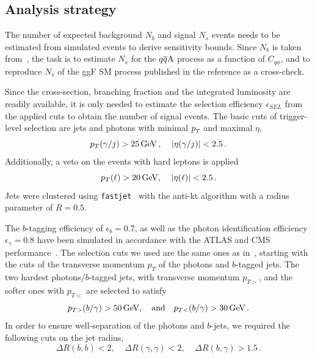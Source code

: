 \subsection{Analysis strategy}
\par The number of expected background $N_b$ and signal $N_s$ events needs to be estimated from simulated events to derive sensitivity bounds. Since  $N_b$ is  taken from~\cite{Azatov:2015oxa}, the task is to estimate $N_s$ for the $q\overline q \rm A$ process as a function of $C_{q\phi}$, and to reproduce $N_s$ of the ggF SM process published in the reference as a cross-check.
\par Since the cross-section, branching fraction and the integrated luminosity are readily available, it is only needed to estimate the selection efficiency $\epsilon_{SEL}$ from the applied cuts to obtain the number of signal events. The basic cuts of trigger-level selection are jets and photons with minimal $p_{\scriptscriptstyle T}$ and maximal $\eta$,
\begin{equation}
	p_T(\gamma/j) > 25 \, \GeV\,, \; \; \; \; |\eta(\gamma/j)| < 2.5\,.
	\label{tricut1}
\end{equation}
Additionally, a veto on the events with hard leptons is applied  
\begin{equation}
	p_T(\ell) > 20 \, \GeV, \; \; \; \; |\eta(\ell)| < 2.5\,.
	\label{tricut2}
\end{equation}
Jets were clustered using \texttt{fastjet}~\cite{Cacciari:2011ma} with the anti-kt algorithm with a radius parameter of $R=0.5$. 
\par The $b$-tagging efficiency of $ \epsilon_b = 0.7$, as well as the photon identification efficiency~$ \epsilon_\gamma = 0.8$ have been simulated in accordance with the ATLAS and CMS performance~\cite{Chatrchyan:2012dk,CMS:2013vea,ATL-PHYS-PUB-2013-009,ATL-PHYS-PUB-2013-009,CMS:2013aoa}. The selection cuts we used are the same ones as in~\cite{Azatov:2015oxa}, starting with the cuts of the transverse momentum $p_T$ of the photons and $b$-tagged jets. The two hardest photons/$b$-tagged jets,  with transverse momentum $p_{T>}$, and the softer ones with $p_{T<}$ are selected to satisfy
\begin{equation}
	p_{T>}(b/ \gamma) > 50 \, \GeV, \quad \text{and} \quad   p_{T<}(b/ \gamma) > 30 \, \GeV\,.
	\label{cut1}
\end{equation}
In order to ensure well-separation of the photons and $b$-jets, we required the following cuts on the jet radius,
\begin{equation}
	\Delta R(b,b) < 2  ,\; \; \; \; \Delta R(\gamma,\gamma) < 2, \; \;  \; \; \Delta R(b,\gamma) > 1.5\,.
	\label{cut2}
\end{equation}
